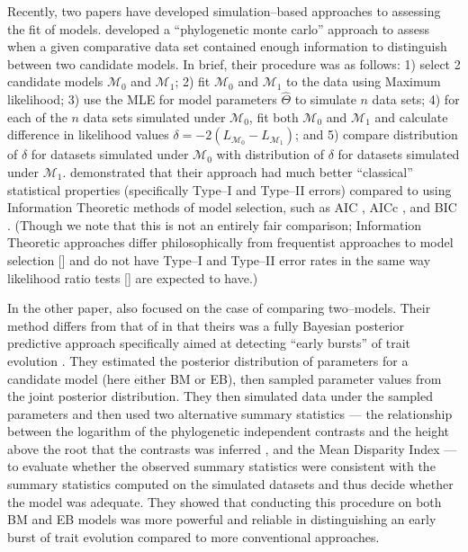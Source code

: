 \documentclass[12pt]{article}
\begin{document}
Recently, two papers have developed simulation--based approaches to assessing the fit of models. \citet{Boettiger2012} developed a ``phylogenetic monte carlo'' approach to assess when a given comparative data set contained enough information to distinguish between two candidate models. In brief, their procedure was as follows: 1) select 2 candidate models $\mathcal{M}_0$ and $\mathcal{M}_1$; 2) fit $\mathcal{M}_0$ and $\mathcal{M}_1$ to the data using Maximum likelihood; 3) use the MLE for model parameters $\hat{\Theta}$ to simulate $n$ data sets; 4) for each of the $n$ data sets simulated under $\mathcal{M}_0$, fit both $\mathcal{M}_0$ and $\mathcal{M}_1$ and calculate difference in likelihood values $\delta = -2(L_{\mathcal{M}_0} - L_{\mathcal{M}_1})$; and 5) compare distribution of $\delta$ for datasets simulated under $\mathcal{M}_0$ with distribution of $\delta$ for datasets simulated under $\mathcal{M}_1$. \citet{Boettiger2012} demonstrated that their approach had much better ``classical'' statistical properties (specifically Type--I and Type--II errors) compared to using Information Theoretic methods of model selection, such as AIC \citep{Akaike1973}, AICc \citep{AICC}, and BIC \citep{Schwarz1978}. (Though we note that this is not an entirely fair comparison; Information Theoretic approaches differ philosophically from frequentist approaches to model selection [\citealt{BA2004}] and do not have Type--I and Type--II error rates in the same way likelihood ratio tests [\citealt{Wilks1938}] are expected to have.)

In the other paper, \citet{SlaterPennell} also focused on the case of comparing two--models. Their method differs from that of \citet{Boettiger2012} in that theirs was a fully Bayesian posterior predictive approach specifically aimed at detecting ``early bursts'' of trait evolution \citep[\textit{sensu}][]{Simpson1944, Simpson1953, Harmon2010}. They estimated the posterior distribution of parameters for a candidate model (here either BM or EB), then sampled parameter values from the joint posterior distribution. They then simulated data under the sampled parameters and then used two alternative summary statistics --- the relationship between the logarithm of the phylogenetic independent contrasts and the height above the root that the contrasts was inferred \citep[a.k.a. the ``node height test'';][]{FreckletonHarvey2006}, and the Mean Disparity Index \citep[MDI;][]{Harmon2003, Slater2010} --- to evaluate whether the observed summary statistics were consistent with the summary statistics computed on the simulated datasets and thus decide whether the model was adequate. They showed that conducting this procedure on both BM and EB models was more powerful and reliable in distinguishing an early burst of trait evolution compared to more conventional approaches.
\end{document}
